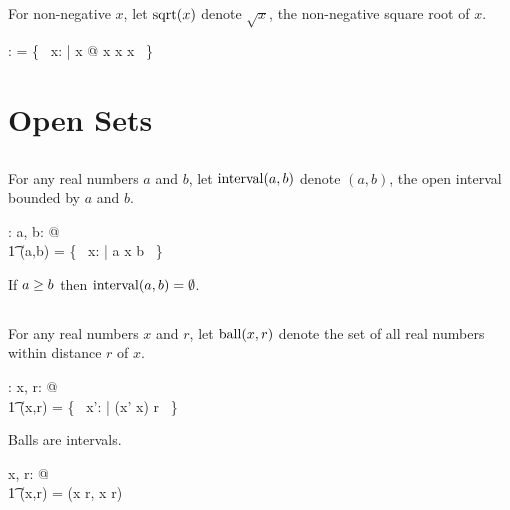\documentclass{amsart}
\begin{document}
\subsection{}

For non-negative $x$, let $\operatorname{sqrt}(x)$ denote $\sqrt{x}$, the non-negative square root of $x$.

\begin{axdef}
	\sqrtR: \R \pfun \R
\where
	\sqrtR = \{~ x: \R | x \geR \zeroR @ x \mulR x \mapsto x ~\}
\end{axdef}

\section{Open Sets}

\subsection{}

For any real numbers $a$ and $b$, let $\operatorname{interval}(a,b)$ denote $(a,b)$, the open interval bounded by $a$ and $b$.

\begin{axdef}
	\intervalR: \R \cross \R \fun \power \R
\where
	\forall a, b: \R @ \\
	\t1	\intervalR(a,b) = \{~ x: \R | a \ltR x \ltR b ~\}
\end{axdef}

\begin{remark}
If $a \mathrel{\geq} b$ then $\operatorname{interval}(a,b) = \emptyset$.
\end{remark}

\subsection{}

For any real numbers $x$ and $r$, let $\operatorname{ball}(x,r)$ denote the set of all real numbers within distance $r$ of $x$.

\begin{axdef}
	\ballR: \R \cross \R \fun \power \R
\where
	\forall x, r: \R @ \\
	\t1	\ballR(x,r) = \{~ x': \R | \absR(x' \subR x) \ltR r ~\}
\end{axdef}

\begin{remark}
Balls are intervals.

\begin{zed}
	\forall x, r: \R @ \\
	\t1	\ballR(x,r) = \intervalR(x \subR r, x \addR r)
\end{zed}

\end{remark}
\end{document}
